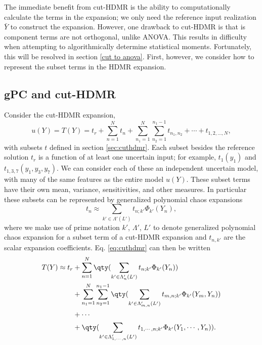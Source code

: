 The immediate benefit from cut-HDMR is the ability to computationally calculate the terms in the expansion;
we only need the reference input realization $\bar Y$ to construct the expansion.  However, one drawback to
cut-HDMR is that is component terms are not orthogonal, unlike ANOVA.  This results in difficulty
when attempting to algorithmically determine statistical moments.  Fortunately, this will be resolved in
section \ref{cut to anova}.  First, however, we consider how to represent the subset terms in the HDMR
expansion.

\subsection{gPC and cut-HDMR}
Consider the cut-HDMR expansion,
\begin{equation}\label{eq:cuthdmr}
  u(Y) = T(Y) = t_r + \sum_{n=1}^N t_n + \sum_{n_1=1}^N \sum_{n_2=1}^{n_1-1}
  t_{n_1,n_2}+\cdots+t_{1,2,\ldots,N},
\end{equation}
with subsets $t$ defined in section \ref{sec:cuthdmr}. Each subset besides the reference solution $t_r$ is a
function of at least one uncertain input; for example, $t_1(y_1)$ and $t_{1,3,7}(y_1,y_3,y_7)$.  We can
consider each of these an independent uncertain model, with many of the same features as the entire model
$u(Y)$.  These subset terms have their own mean, variance, sensitivities, and other measures.  In particular 
these subsets can be represented by generalized polynomial chaos expansions
\begin{equation}
  t_n \approx \sum_{k'\in\Lambda'(L')} t_{n;k'}\Phi_{k'}(Y_n),
\end{equation}
where we make use of prime notation $k'$, $\Lambda'$, $L'$ to denote generalized polynomial chaos expansion
for a subset term of a cut-HDMR expansion and $t_{n,k'}$ are the scalar expansion coefficients.  Eq.
\ref{eq:cuthdmr} can then be written
\begin{align}\label{eq:cut and gpc}
  T(Y) \approx t_r &+ \sum_{n=1}^N \qty(\sum_{k'\in\Lambda_n'(L')} t_{n;k'}\Phi_{k'}(Y_n)) \\ \nonumber
  &+ \sum_{n_1=1}^N \sum_{n_2=1}^{n_1-1} \qty(\sum_{k'\in\Lambda_{m,n}'(L')} t_{m,n;k'}\Phi_{k'}(Y_m,Y_n)) \\
  \nonumber &+\cdots \\ \nonumber
  &+ \qty(\sum_{k'\in\Lambda_{1,\cdots,n}'(L')} t_{1,\cdots,n;k'}\Phi_{k'}(Y_1,\cdots,Y_n)).
\end{align}

